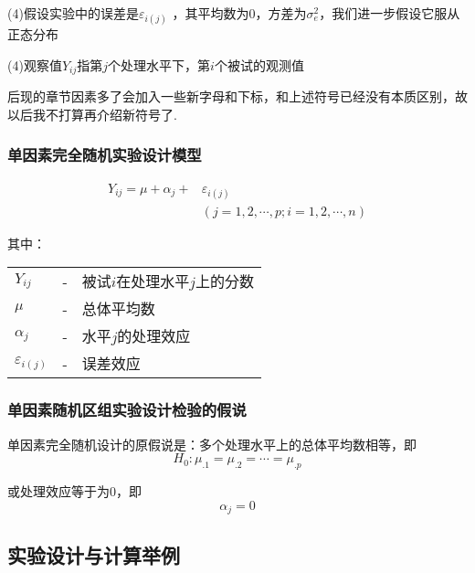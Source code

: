 (4)假设实验中的误差是$\varepsilon _{i\left(j\right)}$
，其平均数为0，方差为$\sigma _e^2$，我们进一步假设它服从正态分布

(4)观察值$Y_{ij}$指第$j$个处理水平下，第$i$个被试的观测值

后现的章节因素多了会加入一些新字母和下标，和上述符号已经没有本质区别，故以后我不打算再介绍新符号了.

\subsubsection{单因素完全随机实验设计模型}
\begin{definition}[单因素完全随机实验设计模型]

\begin{align*}
    Y_{ij}=\mu +\alpha _j+ & \varepsilon _{i\left( j \right)}\\
                           & \left( j=1,2,\cdots,p ; i=1,2,\cdots,n \right)
\end{align*}

其中：

{\renewcommand\arraystretch{1.25}
\begin{tabular}{lcl}
    $Y_{ij}$ & - & 被试$i$在处理水平$j$上的分数 \\
    $\mu$ & - & 总体平均数 \\
    $\alpha _j$ & - & 水平$j$的处理效应 \\
    $\varepsilon_{i \left( j \right)}$ & - & 误差效应 \\
\end{tabular}}

\end{definition}

\subsubsection{单因素随机区组实验设计检验的假说}
单因素完全随机设计的原假说是：多个处理水平上的总体平均数相等，即
\[  H_0: \mu _{.1}=\mu _{.2}=\cdots=\mu _{.p}  \]

或处理效应等于为0，即
\[  \alpha _j=0  \]







\subsection{实验设计与计算举例}

